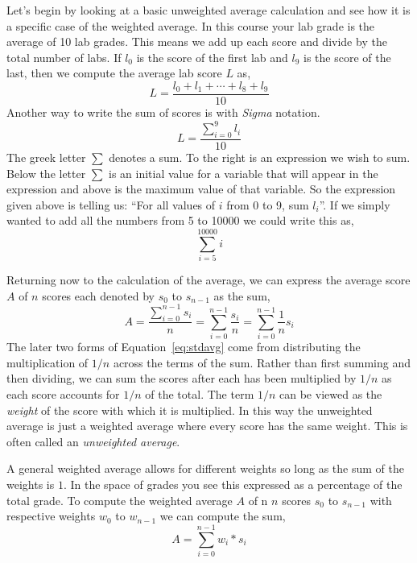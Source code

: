 \documentclass[]{tufte-handout}
\begin{document}
Let's begin by looking at a basic unweighted average calculation and see how it is a specific case of the weighted average. In this course your lab grade is the average of 10 lab grades. This means we add up each score and divide by the total number of labs. If $l_0$ is the score of the first lab and $l_9$ is the score of the last, then we compute the average lab score $L$ as,
\[
  L = \dfrac{l_0 + l_1 + \cdots + l_8 + l_9}{10}
\]
Another way to write the sum of scores is with \textit{Sigma} notation.
\[
  L = \dfrac{\sum\limits_{i=0}^{9} l_i }{10}
\]
The greek letter $\sum$ denotes a sum. To the right is an expression we wish to sum. Below the letter $\sum$ is an initial value for a variable that will appear in the expression and above is the maximum value of that variable. So the expression given above is telling us: ``For all values of $i$ from 0 to 9, sum $l_i$''.  If we simply wanted to add all the numbers from 5 to 10000 we could write this as,
\[
  \sum\limits_{i=5}^{10000} i
\]

Returning now to the calculation of the average, we can express the average score $A$ of $n$ scores each denoted by $s_0$ to $s_{n-1}$ as the sum,
\begin{equation}
  A = \dfrac{\sum\limits_{i=0}^{n-1} s_i}{n} = \sum\limits_{i=0}^{n-1}\dfrac{s_i}{n} = \sum\limits_{i=0}^{n-1}\dfrac{1}{n}s_i
\label{eq:stdavg}
\end{equation}
The later two forms of Equation~\ref{eq:stdavg} come from distributing the multiplication of $1/n$ across the terms of the sum. Rather than first summing and then dividing, we can sum the scores after each has been multiplied by $1/n$ as each score accounts for $1/n$ of the total. The term $1/n$ can be viewed as the \textit{weight} of the score with which it is multiplied. In this way the unweighted average is just a weighted average where every score has the same weight. This is often called an \textit{unweighted average}.

A general weighted average allows for different weights so long as the sum of the weights is $1$. In the space of grades you see this expressed as a percentage of the total grade. To compute the weighted average $A$ of n $n$ scores $s_0$ to $s_{n-1}$ with respective weights $w_0$ to $w_{n-1}$ we can compute the sum,
\begin{equation}
  A = \sum\limits_{i=0}^{n-1} w_i*s_i
\label{eq:wAvg}
\end{equation}
\end{document}
